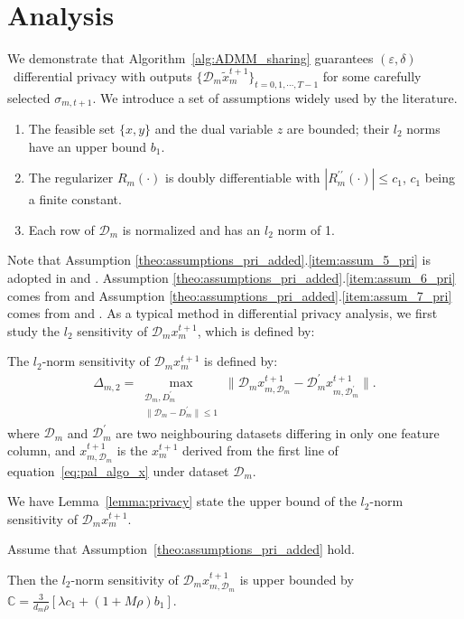 \section{Analysis}
We demonstrate that Algorithm~\ref{alg:ADMM_sharing} guarantees $(\varepsilon, \delta)$~differential privacy with outputs $\{\mathcal{D}_m\tilde{x}_m^{t+1}\}_{t=0,1,\cdots,T-1}$ for some carefully selected $\sigma_{m,t+1}$. We introduce a set of assumptions widely used by the literature.

\begin{assume}\label{theo:assumptions_pri_added}
  \begin{enumerate}
    \item The feasible set $\{x,y\}$ and the dual variable $z$ are bounded; their $l_2$ norms have an upper bound $b_1$.\label{item:assum_5_pri}
    \item The regularizer $R_m(\cdot)$ is doubly differentiable
    with $|R_m^{\prime\prime}(\cdot)|\leq c_1$,  $c_1$ being a finite constant.\label{item:assum_6_pri}
    \item Each row of $\mathcal{D}_m$ is normalized and has an $l_2$ norm of 1.\label{item:assum_7_pri}
  \end{enumerate}
\end{assume}
Note that Assumption \ref{theo:assumptions_pri_added}.\ref{item:assum_5_pri} is adopted in \cite{sarwate2013signal} and \cite{wang2019global}. Assumption \ref{theo:assumptions_pri_added}.\ref{item:assum_6_pri} comes from \cite{zhang2017dynamic} and Assumption \ref{theo:assumptions_pri_added}.\ref{item:assum_7_pri} comes from \cite{zhang2017dynamic}
and \cite{sarwate2013signal}. As a typical method in differential privacy analysis, we first study the $l_2$ sensitivity of
$\mathcal{D}_mx_m^{t+1}$, which is defined by:
\begin{defi}
The $l_2$-norm sensitivity of $\mathcal{D}_mx_m^{t+1}$ is defined by:
  \begin{eqnarray*}
\Delta_{m,2}=\max_{\substack{\mathcal{D}_m,D_m^{\prime}\\
\|\mathcal{D}_m-D_m^{\prime}\|\leq1
}}\|\mathcal{D}_mx_{m,\mathcal{D}_m}^{t+1}
-\mathcal{D}_m^{\prime}x_{m,\mathcal{D}_m^{\prime}}^{t+1}\|.
  \end{eqnarray*}
  where $\mathcal{D}_m$ and $\mathcal{D}_m^{\prime}$ are two neighbouring datasets differing in 
  only one feature column, and 
  $x_{m,\mathcal{D}_m}^{t+1}$ is the $x_m^{t+1}$ derived from the first line of equation~\eqref{eq:pal_algo_x} under dataset $\mathcal{D}_m$.
\end{defi}
We have Lemma~\ref{lemma:privacy} state the upper bound of the $l_2$-norm sensitivity of $\mathcal{D}_mx_m^{t+1}$.
\begin{lemma}
\label{lemma:privacy}
Assume that Assumption~\ref{theo:assumptions_pri_added} hold.

Then the $l_2$-norm sensitivity of $\mathcal{D}_mx_{m,\mathcal{D}_m}^{t+1}$ is upper bounded by $\mathbb{C}=\frac{3}{d_m\rho}\left[\lambda c_1+(1+M\rho)b_1\right]$.
\end{lemma}

